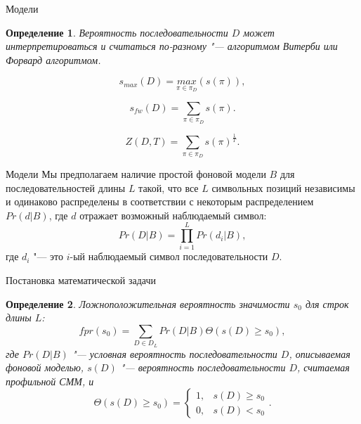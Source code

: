 \documentclass{beamer}
\newtheorem{defenition}{Определение}
\begin{document}
	\begin{frame}{Модели}
		\begin{defenition}
			\textit{Вероятность последовательности} $D$ может интерпретироваться и считаться по-разному "--- алгоритмом \textit{Витерби} или \textit{Форвард} алгоритмом.
		\end{defenition}
		
		\begin{equation}
			s_{max}(D) = \underset{\pi \in \pi_{D}}{max}(s(\pi)),
		\end{equation}
	
		\begin{equation}
			s_{fw}(D) = \sum_{\pi \in \pi_{D}}s(\pi).
		\end{equation}
	
		\begin{equation}
			Z(D, T)	= \sum_{\pi \in \pi_{D}}s(\pi)^{\frac{1}{T}}.
		\end{equation}
	\end{frame}	

	\begin{frame}{Модели}
		Мы предполагаем наличие простой фоновой модели $B$ для последовательностей длины $L$ такой, что все $L$ символьных позиций независимы и одинаково распределены в соответствии с некоторым распределением $Pr(d|B)$, где $d$ отражает возможный наблюдаемый символ:
		\begin{equation}
			Pr(D|B) = \prod_{i=1}^{L}Pr(d_{i}|B),
		\end{equation}
		где $d_{i}$ "--- это $i$-ый наблюдаемый символ последовательности $D$.
	\end{frame}

	\begin{frame}{Постановка математической задачи}
		\begin{defenition}
			Ложноположительная вероятность значимости $s_{0}$ для строк длины $L$:	
			\begin{equation}
				fpr(s_{0}) =  \sum_{D \in D_{L}} Pr(D|B) \Theta(s(D) \geq s_{0}),
			\end{equation}
			где $Pr(D|B)$ "--- условная вероятность последовательности $D$, описываемая фоновой моделью, $s(D)$ "--- вероятность последовательности $D$, считаемая профильной СММ, и
			\[
			\Theta(s(D) \geq s_{0}) = 
			\begin{cases}
				1, & s(D) \geq s_{0}\\
				0, & s(D) < s_{0}
			\end{cases}.
			\]
		\end{defenition}		
	\end{frame}
	
\end{document}
